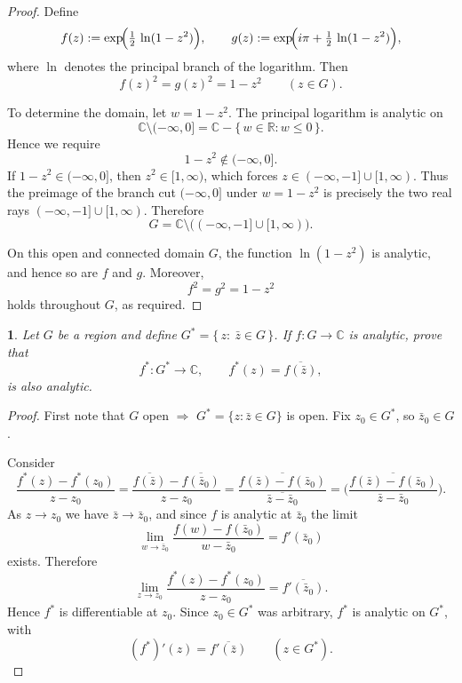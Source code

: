 \documentclass[12pt, a4paper]{report}
\theoremstyle{spaced}
\newtheorem{exercise}{}
\newcommand{\setexercise}[1]{\setcounter{exercise}{#1-1}}
\begin{document}
\begin{proof}
	Define
	\[
		f(z):= \exp\!\Bigl(\tfrac12\,\ln(1-z^2)\Bigr),
		\qquad
		g(z):= \exp\!\Bigl(i\pi + \tfrac12\,\ln(1-z^2)\Bigr),
	\]
	where \(\ln\) denotes the principal branch of the logarithm.
	Then
	\[
		f(z)^2 = g(z)^2 = 1 - z^2\qquad (z\in G).
	\]

	To determine the domain, let \(w = 1 - z^2\).
	The principal logarithm is analytic on
	\[
		\mathbb{C}\setminus(-\infty,0]
		= \mathbb{C} - \{\,w\in\mathbb{R} : w\le 0\,\}.
	\]
	Hence we require
	\[
		1 - z^2 \notin (-\infty,0].
	\]
	If \(1 - z^2 \in (-\infty,0]\), then \(z^2 \in [1,\infty)\), which forces
	\(z\in(-\infty,-1]\cup[1,\infty)\).
	Thus the preimage of the branch cut \((-\infty,0]\) under \(w = 1 - z^2\)
	is precisely the two real rays \((-\infty,-1]\cup[1,\infty)\).
		Therefore
		\[
		G = \mathbb{C}\setminus\bigl((-\infty,-1]\cup[1,\infty)\bigr).
	\]

	On this open and connected domain \(G\), the function \(\ln(1-z^2)\) is analytic,
	and hence so are \(f\) and \(g\).  Moreover,
	\[
		f^2 = g^2 = 1 - z^2
	\]
	holds throughout \(G\), as required.
\end{proof}

\setexercise{19}
\begin{exercise}
	Let \(G\) be a region and define \(G^*=\{\,z:\ \bar z\in G\,\}\). If \(f:G\to\mathbb{C}\) is analytic, prove that
	\[
		f^*:G^*\to\mathbb{C},\qquad f^*(z)=\overline{f(\bar z)},
	\]
	is also analytic.
\end{exercise}

\begin{proof}
	First note that $G$ open $\Rightarrow$ $G^*=\{z:\bar z\in G\}$ is open. Fix $z_0\in G^*$, so $\bar z_0\in G$.

	Consider
	\[
		\frac{f^*(z)-f^*(z_0)}{z-z_0}
		=\frac{\overline{f(\bar z)}-\overline{f(\bar z_0)}}{z-z_0}
		=\overline{\frac{f(\bar z)-f(\bar z_0)}{\overline{\bar z-\bar z_0}}}
		=\overline{\Big(\frac{f(\bar z)-f(\bar z_0)}{\bar z-\bar z_0}\Big)}.
	\]
	As $z\to z_0$ we have $\bar z\to \bar z_0$, and since $f$ is analytic at $\bar z_0$ the limit
	\[
		\lim_{w\to \bar z_0}\frac{f(w)-f(\bar z_0)}{w-\bar z_0}=f'(\bar z_0)
	\]
	exists. Therefore
	\[
		\lim_{z\to z_0}\frac{f^*(z)-f^*(z_0)}{z-z_0}
		=\overline{f'(\bar z_0)}.
	\]
	Hence $f^*$ is differentiable at $z_0$. Since $z_0\in G^*$ was arbitrary, $f^*$ is analytic on $G^*$, with
	\[
		(f^*)'(z)=\overline{f'(\bar z)}\qquad(z\in G^*).
	\]
\end{proof}
\end{document}
